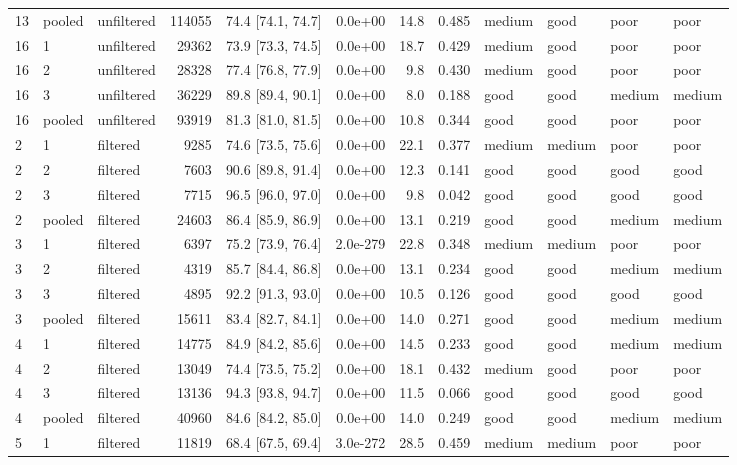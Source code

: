 \begin{longtable}{lllrrrrrllll}
13 & pooled & unfiltered & 114055 & 74.4 [74.1, 74.7] & 0.0e+00 & 14.8 & 0.485 & medium & good & poor & poor \\
16 & 1 & unfiltered & 29362 & 73.9 [73.3, 74.5] & 0.0e+00 & 18.7 & 0.429 & medium & good & poor & poor \\
16 & 2 & unfiltered & 28328 & 77.4 [76.8, 77.9] & 0.0e+00 & 9.8 & 0.430 & medium & good & poor & poor \\
16 & 3 & unfiltered & 36229 & 89.8 [89.4, 90.1] & 0.0e+00 & 8.0 & 0.188 & good & good & medium & medium \\
16 & pooled & unfiltered & 93919 & 81.3 [81.0, 81.5] & 0.0e+00 & 10.8 & 0.344 & good & good & poor & poor \\
2 & 1 & filtered & 9285 & 74.6 [73.5, 75.6] & 0.0e+00 & 22.1 & 0.377 & medium & medium & poor & poor \\
2 & 2 & filtered & 7603 & 90.6 [89.8, 91.4] & 0.0e+00 & 12.3 & 0.141 & good & good & good & good \\
2 & 3 & filtered & 7715 & 96.5 [96.0, 97.0] & 0.0e+00 & 9.8 & 0.042 & good & good & good & good \\
2 & pooled & filtered & 24603 & 86.4 [85.9, 86.9] & 0.0e+00 & 13.1 & 0.219 & good & good & medium & medium \\
3 & 1 & filtered & 6397 & 75.2 [73.9, 76.4] & 2.0e-279 & 22.8 & 0.348 & medium & medium & poor & poor \\
3 & 2 & filtered & 4319 & 85.7 [84.4, 86.8] & 0.0e+00 & 13.1 & 0.234 & good & good & medium & medium \\
3 & 3 & filtered & 4895 & 92.2 [91.3, 93.0] & 0.0e+00 & 10.5 & 0.126 & good & good & good & good \\
3 & pooled & filtered & 15611 & 83.4 [82.7, 84.1] & 0.0e+00 & 14.0 & 0.271 & good & good & medium & medium \\
4 & 1 & filtered & 14775 & 84.9 [84.2, 85.6] & 0.0e+00 & 14.5 & 0.233 & good & good & medium & medium \\
4 & 2 & filtered & 13049 & 74.4 [73.5, 75.2] & 0.0e+00 & 18.1 & 0.432 & medium & good & poor & poor \\
4 & 3 & filtered & 13136 & 94.3 [93.8, 94.7] & 0.0e+00 & 11.5 & 0.066 & good & good & good & good \\
4 & pooled & filtered & 40960 & 84.6 [84.2, 85.0] & 0.0e+00 & 14.0 & 0.249 & good & good & medium & medium \\
5 & 1 & filtered & 11819 & 68.4 [67.5, 69.4] & 3.0e-272 & 28.5 & 0.459 & medium & medium & poor & poor \\

\end{longtable}
